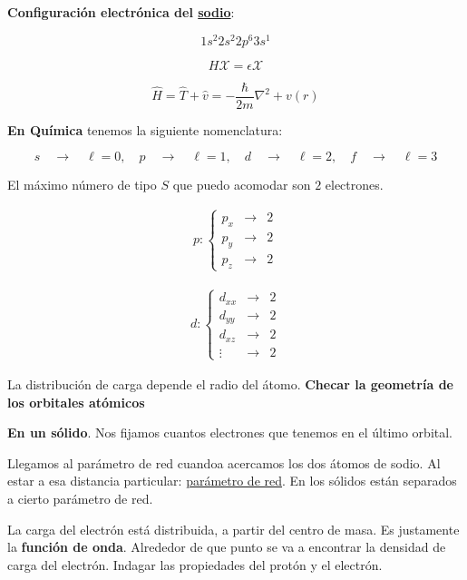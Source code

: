 \documentclass{article}
\begin{document}
\textbf{Configuración electrónica del \underline{sodio}}: 


\[1s^{2}2s^{2}2p^{6}3s^{1}  \]


\[ \boxed{ H\mathcal{X} = \epsilon \mathcal{X}} \]

\[  \hat{H} = \hat{T}+\hat{v} = - \frac{  \hbar }{2m}\nabla^{2} + v(r) \]


\textbf{En Química} tenemos la siguiente nomenclatura:

\[ s \quad \to \quad \ell = 0, \quad p \quad \to \quad \ell =1, \quad d \quad \to \quad \ell = 2, \quad f \quad \to \quad \ell =3    \]

El máximo número de tipo $S$ que puedo acomodar son $2$ electrones. 

\begin{equation}
\begin{split}
 p : \left\{ \begin{array}{ccc}
 p_{x} & \to & 2\\
 p_{y} & \to & 2\\
 p_{z} & \to & 2
\end{array}   \right.
\end{split}
\end{equation}

\begin{equation}
\begin{split}
d : \left\{ \begin{array}{ccc}
 d_{xx} & \to & 2\\
 d_{yy} & \to & 2\\
 d_{xz} & \to & 2\\
 \vdots & \to & 2
\end{array}   \right.
\end{split}
\end{equation}

La distribución de carga depende el radio del átomo. \textbf{Checar la geometría de los orbitales atómicos}

\textbf{En un sólido}. Nos fijamos cuantos electrones que tenemos en el último orbital.

Llegamos al parámetro de red cuandoa acercamos los dos átomos de sodio. Al estar a esa distancia particular: \underline{parámetro de red}. En los sólidos están separados a cierto parámetro de red. 

La carga del electrón está distribuida, a partir del centro de masa. Es justamente la \textbf{función de onda}. Alrededor de que punto se va a encontrar la densidad de carga del electrón. Indagar las propiedades del protón y el electrón. 
\end{document}
